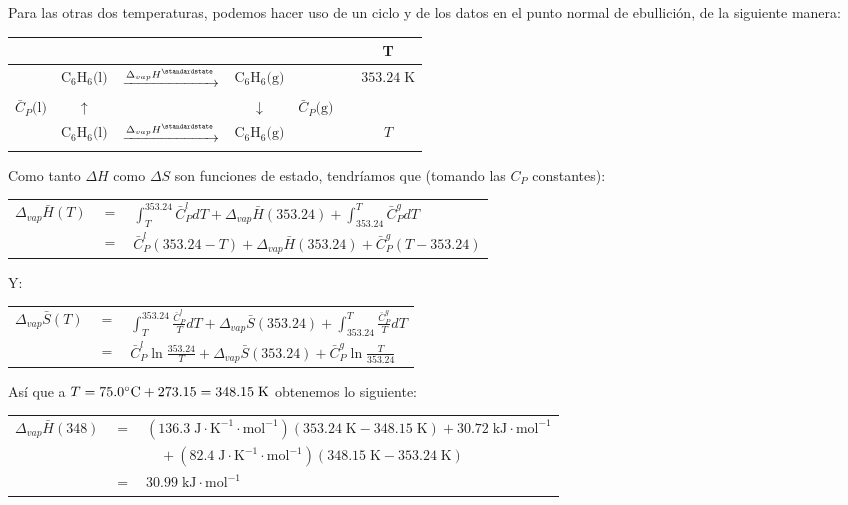 \documentclass[a4paper,12pt]{article}
\begin{document}
\begin{enumerate}
Para las otras dos temperaturas, podemos hacer uso de un ciclo y de los datos en el punto normal de ebullici\'on, de la siguiente manera:

\begin{center}
\begin{tabular}{r c c c l c | c}
& & & & & \quad & T \\\hline
& $\mbox{C}_6\mbox{H}_6\mbox{(l)}$ & $\xrightarrow{\Delta_{vap}H^\standardstate}$ & $\mbox{C}_6\mbox{H}_6\mbox{(g)}$ & & \quad\quad & $353.24\;\mbox{K}$ \\
 ${\bar{C}_P\mbox{(l)}}$ & $\uparrow$ & & $\downarrow$ & ${\bar{C}_P\mbox{(g)}}$ & \quad\quad & \\
& $\mbox{C}_6\mbox{H}_6\mbox{(l)}$ & $\xrightarrow{\Delta_{vap}H^\standardstate}$ & $\mbox{C}_6\mbox{H}_6\mbox{(g)}$ & & \quad\quad & $T$ \\\hline
\end{tabular}
\end{center}

Como tanto $\Delta H$ como $\Delta S$ son funciones de estado, tendr\'iamos que (tomando las $C_P$ constantes):

\begin{center}
\begin{tabular}{r c l}
$\Delta_{vap}\bar{H}(T)$ & $=$ & $\int_{T}^{353.24}\bar{C}_P^ldT+\Delta_{vap}\bar{H}(353.24)+\int_{353.24}^{T}\bar{C}_P^gdT$ \\
& $=$ & $\bar{C}_P^l(353.24-T)+\Delta_{vap}\bar{H}(353.24)+\bar{C}_P^g(T-353.24)$ 
\end{tabular}
\end{center}

Y:

\begin{center}
\begin{tabular}{r c l}
$\Delta_{vap}\bar{S}(T)$ & $=$ & $\int_{T}^{353.24}\frac{\bar{C}_P^l}{T}dT+\Delta_{vap}\bar{S}(353.24)+\int_{353.24}^{T}\frac{\bar{C}_P^g}{T}dT$ \\
& $=$ & $\bar{C}_P^l\ln\frac{353.24}{T}+\Delta_{vap}\bar{S}(353.24)+\bar{C}_P^g\ln\frac{T}{353.24}$
\end{tabular}
\end{center}

As\'i que a $T=75.0\celsius+273.15=348.15\;\mbox{K}$ obtenemos lo siguiente:

\begin{tabular}{r c l}
$\Delta_{vap}\bar{H}(348)$ & $=$ & $(136.3\;\mbox{J}\cdot\mbox{K}^{-1}\cdot\mbox{mol}^{-1})(353.24\;\mbox{K}-348.15\;\mbox{K})+30.72\;\mbox{kJ}\cdot\mbox{mol}^{-1}$ \\
& & $\quad+(82.4\;\mbox{J}\cdot\mbox{K}^{-1}\cdot\mbox{mol}^{-1})(348.15\;\mbox{K}-353.24\;\mbox{K})$ \\
& $=$ & $30.99\;\mbox{kJ}\cdot\mbox{mol}^{-1}$ 
\end{tabular}


\end{enumerate}
\end{document}
